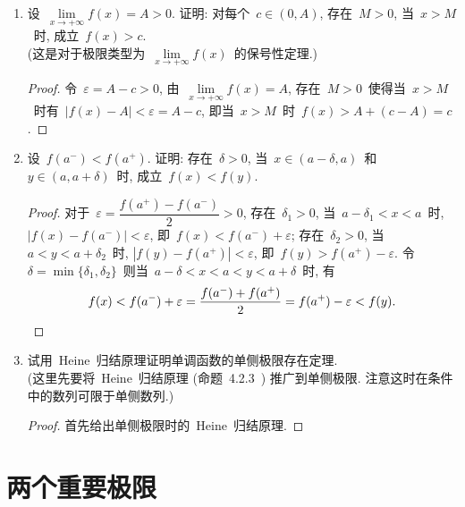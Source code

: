 \documentclass[UTF8,a4paper,11pt,twoside]{book}
\begin{document}
\begin{enumerate}
\begin{proof}
		      对于任意给定的~$\varepsilon>0$, 由于~$\lim\limits_{n\to\infty} f(x_n)=A$, 存在~$N\in\mathbf{N}_{+}$~使得~$|f(x_n)-A|<\varepsilon$, 即当~$n>N$~时~$f(x_n)>A-\varepsilon$. 固定~$n>N$, 令~$\delta=\dfrac{b-x_n}{2}$, 则当~$b-\delta<x<b$~时, $x>x_n$, 由于~$f$~在~$(a,b)$~上单调增加以~$A$~为上界, 有
		      \[
			      A-\varepsilon<f(x_n)\leqslant f(x)<A<A+\varepsilon.
		      \]
		      即~$\lim\limits_{x\to b}=A$. \qedhere
	      \end{proof}

	\item 设~$\lim\limits_{x\to+\infty}f(x)=A>0$. 证明: 对每个~$c\in(0,A)$, 存在~$M>0$, 当~$x>M$~时, 成立~$f(x)>c$. \\
	      (这是对于极限类型为~$\lim\limits_{x\to+\infty} f(x)$~的保号性定理.)
	      \begin{proof}
		      令~$\varepsilon=A-c>0$, 由~$\lim\limits_{x\to+\infty} f(x)=A$, 存在~$M>0$~使得当~$x>M$~时有~$|f(x)-A|<\varepsilon=A-c$, 即当~$x>M$~时~$f(x)>A+(c-A)=c$. \qedhere
	      \end{proof}

	\item 设~$f(a^{-})<f(a^{+})$. 证明: 存在~$\delta>0$, 当~$x\in(a-\delta,a)$~和~$y\in(a,a+\delta)$~时, 成立~$f(x)<f(y)$.
	      \begin{proof}
		      对于~$\varepsilon=\dfrac{f(a^{+})-f(a^{-})}{2}>0$, 存在~$\delta_1>0$, 当~$a-\delta_1<x<a$~时, $|f(x)-f(a^{-})|<\varepsilon$, 即~$f(x)<f(a^{-})+\varepsilon$; 存在~$\delta_2>0$, 当~$a<y<a+\delta_2$~时, $|f(y)-f(a^{+})|<\varepsilon$, 即~$f(y)>f(a^{+})-\varepsilon$. 令~$\delta=\min\{\delta_1,\delta_2\}$~则当~$a-\delta<x<a<y<a+\delta$~时, 有
		      \[
			      f(x)<f(a^{-})+\varepsilon=\dfrac{f(a^{-})+f(a^{+})}{2}=f(a^{+})-\varepsilon<f(y). \qedhere
		      \]
	      \end{proof}

	\item 试用~Heine~归结原理证明单调函数的单侧极限存在定理. \\
	      (这里先要将~Heine~归结原理 (命题~4.2.3~) 推广到单侧极限. 注意这时在条件中的数列可限于单侧数列.)
	      \begin{proof}
		      首先给出单侧极限时的~Heine~归结原理.
	      \end{proof}
\end{enumerate}

\section{两个重要极限}
\end{document}
